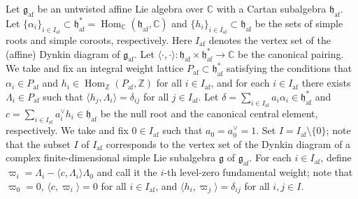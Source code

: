 \documentclass[10pt]{amsart}
\theoremstyle{definition}\newtheorem{defi}[theo]{Definition}
\theoremstyle{remark}\newtheorem{rema}[theo]{Remark}
\newcommand{\Fg}{\mathfrak{g}}
\newcommand{\Fh}{\mathfrak{h}}
\newcommand{\BC}{\mathbb{C}}
\newcommand{\BZ}{\mathbb{Z}}
\DeclareMathOperator{\af}{af}
\DeclareMathOperator{\Hom}{Hom}
\begin{document}
Let 
$\Fg_{\af}$ 
be an untwisted affine Lie algebra over $\BC$ 
with a Cartan subalgebra $\Fh_{\af}$. 
Let 
$\{ \alpha_i \}_{i \in I_{\af}} \subset \Fh_{\af}^* = \Hom_{\BC}(\Fh_{\af},\BC)$ 
and 
$\{ h_i \}_{i \in I_{\af}} \subset \Fh_{\af}$
be the sets of simple roots and simple coroots, respectively. 
Here $I_{\af}$ denotes the vertex set of the (affine) Dynkin diagram of $\Fg_{\af}$. 
Let 
$\langle \cdot , \cdot \rangle : \Fh_{\af} \times \Fh_{\af}^* \rightarrow \BC$ 
be the canonical pairing. 
We take and fix an integral weight lattice 
$P_{\af} \subset \Fh_{\af}^*$ 
satisfying the conditions that 
$\alpha_i \in P_{\af}$ 
and 
$h_i \in \Hom_{\BZ}(P_{\af},\BZ)$ 
for all 
$i \in I_{\af}$, and for each 
$i \in I_{\af}$
there exists 
$\Lambda_i \in P_{\af}$ 
such that 
$\langle h_j , \Lambda_i \rangle = \delta_{ij}$ 
for all 
$j \in I_{\af}$. 
Let 
$\delta = \sum_{i \in I_{\af}} a_i \alpha_i \in \Fh_{\af}^*$ 
and 
$c = \sum_{i \in I_{\af}} a_i^{\vee} h_i \in \Fh_{\af}$ 
be the null root and the canonical central element, respectively.
We take and fix $0 \in I_{\af}$ such that 
$a_0 = a_0^{\vee} = 1$. 
Set 
$I = I_{\af} \setminus \{ 0 \}$; 
note that the subset $I$ of $I_{\af}$ 
corresponds to the vertex set of the Dynkin diagram of a 
complex finite-dimensional simple Lie subalgebra $\Fg$ of $\Fg_{\af}$. 
For each 
$i \in I_{\af}$, 
define
$\varpi_i = \Lambda_i - \langle c , \Lambda_i \rangle \Lambda_0$
and call it the 
$i$-th level-zero fundamental weight; 
note that 
$\varpi_0 = 0$, 
$\langle c , \varpi_i \rangle = 0$
for all $i \in I_{\af}$, and 
$\langle h_i , \varpi_j \rangle = \delta_{ij}$ 
for all $i,j \in I$.
\end{document}
